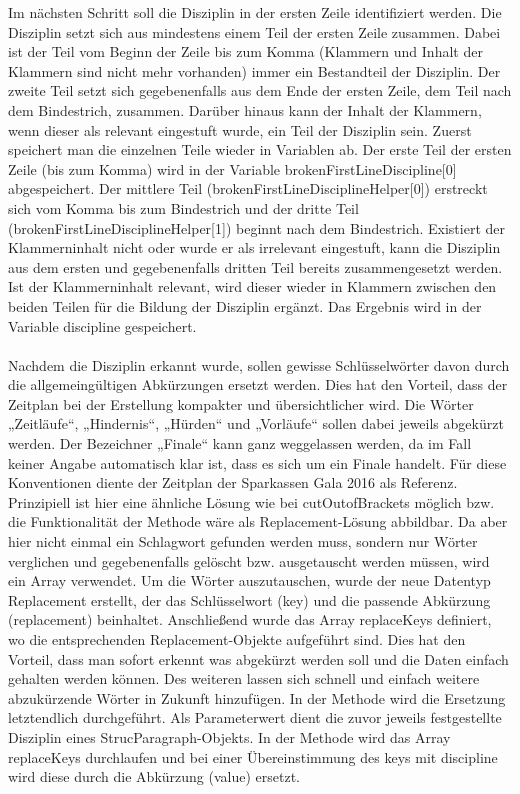 {Im nächsten Schritt soll die Disziplin in der ersten Zeile identifiziert werden. Die Disziplin setzt sich aus mindestens einem Teil der ersten Zeile zusammen. Dabei ist der Teil vom Beginn der Zeile bis zum Komma (Klammern und Inhalt der Klammern sind nicht mehr vorhanden) immer ein Bestandteil der Disziplin. Der zweite Teil setzt sich gegebenenfalls aus dem Ende der ersten Zeile, dem Teil nach dem Bindestrich, zusammen. Darüber hinaus kann der Inhalt der Klammern, wenn dieser als relevant eingestuft wurde, ein Teil der Disziplin sein.
Zuerst speichert man die einzelnen Teile wieder in Variablen ab. Der erste Teil der ersten Zeile (bis zum Komma) wird in der Variable brokenFirstLineDiscipline[0] abgespeichert. Der mittlere Teil (brokenFirstLineDisciplineHelper[0]) erstreckt sich vom Komma bis zum Bindestrich und der dritte Teil (brokenFirstLineDisciplineHelper[1]) beginnt nach dem Bindestrich. Existiert der Klammerninhalt nicht oder wurde er als irrelevant eingestuft, kann die Disziplin aus dem ersten und gegebenenfalls dritten Teil bereits zusammengesetzt werden. Ist der Klammerninhalt relevant, wird dieser wieder in Klammern zwischen den beiden Teilen für die Bildung der Disziplin ergänzt. Das Ergebnis wird in der Variable discipline gespeichert.\\
\\
Nachdem die Disziplin erkannt wurde, sollen gewisse Schlüsselwörter davon durch die allgemeingültigen Abkürzungen ersetzt werden. Dies hat den Vorteil, dass der Zeitplan bei der Erstellung kompakter und übersichtlicher wird. Die Wörter „Zeitläufe“, „Hindernis“, „Hürden“ und „Vorläufe“ sollen dabei jeweils abgekürzt werden. Der Bezeichner „Finale“ kann ganz weggelassen werden, da im Fall keiner Angabe automatisch klar ist, dass es sich um ein Finale handelt. Für diese Konventionen diente der Zeitplan der Sparkassen Gala 2016 als Referenz. Prinzipiell ist hier eine ähnliche Lösung wie bei cutOutofBrackets möglich bzw. die Funktionalität der Methode wäre als Replacement-Lösung abbildbar. Da aber hier nicht einmal ein Schlagwort gefunden werden muss, sondern nur Wörter verglichen und gegebenenfalls gelöscht bzw. ausgetauscht werden müssen, wird ein Array verwendet. Um die Wörter auszutauschen, wurde der neue Datentyp Replacement erstellt, der das Schlüsselwort (key) und die passende Abkürzung (replacement) beinhaltet. Anschließend wurde das Array replaceKeys definiert, wo die entsprechenden Replacement-Objekte aufgeführt sind. Dies hat den Vorteil, dass man sofort erkennt was abgekürzt werden soll und die Daten einfach gehalten werden können. Des weiteren lassen sich schnell und einfach weitere abzukürzende Wörter in Zukunft hinzufügen. In der Methode wird die Ersetzung letztendlich durchgeführt. Als Parameterwert dient die zuvor jeweils festgestellte Disziplin eines StrucParagraph-Objekts. In der Methode wird das Array replaceKeys durchlaufen und bei einer Übereinstimmung des keys mit discipline wird diese durch die Abkürzung (value) ersetzt.

}

